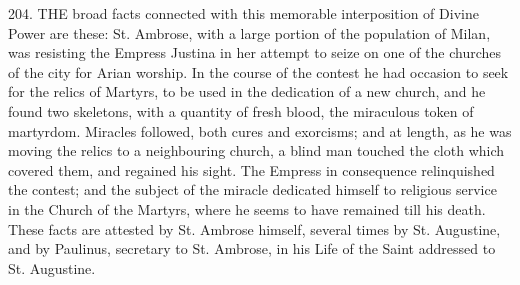 
204.
THE broad facts connected with
this memorable interposition of Divine Power are these: St. Ambrose,
with a large portion of the population of Milan, was resisting the
Empress Justina in her attempt to seize on one of the churches of the
city for Arian worship. In the course of the contest he had occasion
to seek for the relics of Martyrs, to be used in the dedication of a
new church, and he found two skeletons, with a quantity of fresh
blood, the miraculous token of martyrdom. Miracles followed, both
cures and exorcisms; and at length, as he was moving the relics to a
neighbouring church, a blind man touched the cloth which covered them,
and regained his sight. The Empress in consequence relinquished the
contest; and the subject of the miracle dedicated himself to religious
service in the Church of the Martyrs, where he seems to have remained
till his death. These facts are attested by St. Ambrose himself,
several times by St. Augustine, and by Paulinus, secretary to
St. Ambrose, in his Life of the Saint addressed to St. Augustine.

